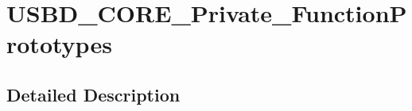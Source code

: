 \hypertarget{group___u_s_b_d___c_o_r_e___private___function_prototypes}{\section{U\-S\-B\-D\-\_\-\-C\-O\-R\-E\-\_\-\-Private\-\_\-\-Function\-Prototypes}
\label{group___u_s_b_d___c_o_r_e___private___function_prototypes}
}


\subsection{Detailed Description}
